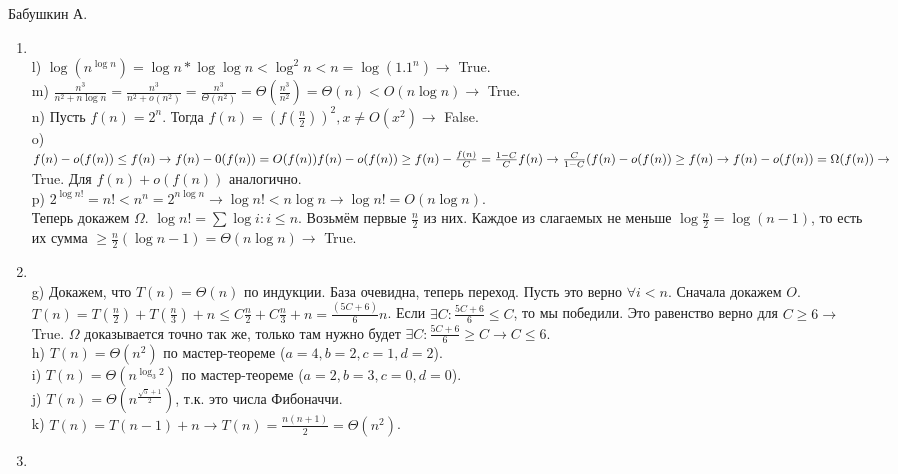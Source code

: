 \documentclass[12pt]{article} %
\begin{document}
Бабушкин А.

\begin{enumerate}
  \setlength{\parskip}{0pt} %
  \setlength{\itemsep}{0pt} %
  \item ~\\
	l) $\log(n^{\log n}) = \log n * \log \log n < \log^{2} n < n = \log (1.1^{n}) \to $ True. \\
	m) $\frac {n^3}{n^2 + n \log n} = \frac {n^3}{n^2 + o(n^2)} = \frac {n^3}{\Theta(n^2)} = \Theta (\frac {n^3}{n^2}) = \Theta ({n}) < {O} (n \log n) \to $ True. \\
	n) Пусть $f(n) = 2^n$. Тогда $f(n) = (f({\frac{n}{2}}))^2, x \ne O(x^2) \to$ False. \\
	o) $f(n) - o(f(n)) \le f(n) \to f(n) - 0(f(n)) = O(f(n)) \\
 f(n) - o(f(n)) \ge f(n) - \frac {f(n)}{C} =  \frac {1 - C}{C} f(n) \to \frac {C}{1 - C}(f(n) - o(f(n)) \ge f(n) \to f(n) - o(f(n)) = \Omega(f(n)) \to $ True. Для $f(n) + o(f(n))$ аналогично.\\
	p) $2^{\log n!} = n! < n^n = 2^{n \log n} \to \log n! < n \log n \to \log n! = O(n \log n)$. \\
	Теперь докажем $\Omega$. $\log n! = \sum {\log i} : i \le n$. Возьмём первые $\frac {n}{2}$ из них. Каждое из слагаемых не меньше $\log \frac {n}{2} = \log (n - 1)$, то есть их сумма $\ge \frac {n}{2} (\log n - 1) = \Theta (n \log n) \to $ True.
  \item ~\\
	g) Докажем, что $T(n) = \Theta(n)$ по индукции. База очевидна, теперь переход. Пусть это верно $\forall i < n$. Сначала докажем $O$. $T(n) = T(\frac {n}{2}) + T(\frac {n}{3}) + n \le C\frac{n}{2} + C\frac {n}{3} + n = \frac {(5C + 6)}{6}n $. Если $\exists C : \frac {5C + 6}{6}  \le C$, то мы победили. Это равенство верно для $C \ge 6 \to$ True. $\Omega$ доказывается точно так же, только там нужно будет $\exists C : \frac {5C + 6}{6} \ge C \to C \le 6$. \\
	h) $T(n) = \Theta(n^2)$ по мастер-теореме ($a= 4, b = 2, c = 1, d = 2$). \\
	i) $T(n) = \Theta(n^{\log_{3}{2}})$ по мастер-теореме ($a= 2, b = 3, c = 0, d = 0$). \\
	j) $T(n) = \Theta(n^{\frac {\sqrt{5} + 1}{2}})$, т.к. это числа Фибоначчи. \\
	k) $T(n) = T(n - 1) + n \to T(n) = \frac {n(n + 1)}{2} = \Theta(n^2)$.
  \item ~\\

\end{enumerate}
\end{document}
